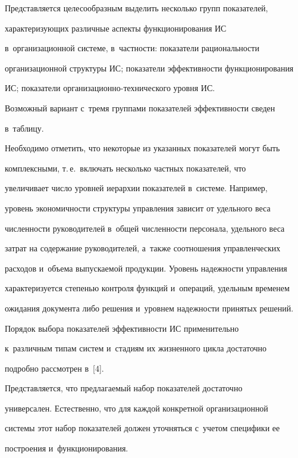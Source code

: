   

  Представляется целесообразным выделить несколько групп показателей, 

характеризующих различные аспекты функционирования ИС 

в~организационной системе, в~частности: показатели рациональности 

организационной структуры ИС; показатели эффективности функционирования 

ИС; показатели организационно-технического уровня ИС. 

  

  Возможный вариант с~тремя группами показателей эффективности сведен 

в~таблицу.

  

  

  Необходимо отметить, что некоторые из указанных показателей могут быть 

комплексными, т.\,е.\ включать несколько частных показателей, что 

увеличивает число уровней иерархии показателей в~системе. Например, 

уровень эко\-но\-мич\-ности структуры управ\-ле\-ния зависит от удельного веса 

численности руководителей в~общей чис\-лен\-ности персонала, удельного веса 

затрат на содержание руководителей, а~также соотношения управ\-лен\-че\-ских 

расходов и~объема выпускаемой продукции. Уровень надежности управления 

характеризуется степенью контроля функций и~операций, удельным временем 

ожидания документа либо решения и~уровнем на\-деж\-ности принятых решений.

  

  Порядок выбора показателей эффективности ИС применительно 

к~различным типам систем и~стадиям их жизненного цикла достаточно 

подробно рассмотрен в~[4].

  

 Представляется, что предлагаемый набор показателей достаточно 

универсален. Естественно, что для каждой конкретной организационной 

системы этот набор показателей должен уточняться с~учетом специфики ее 

построения и~функционирования.

